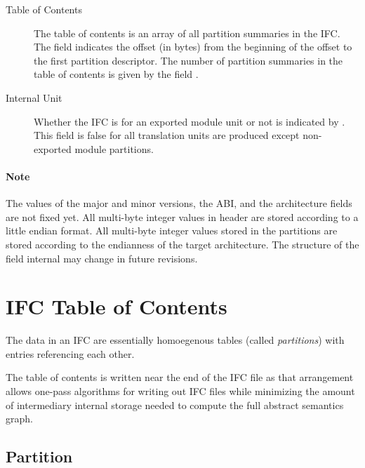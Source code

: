 \begin{description}
\item[Table of Contents]
	The table of contents is an array of all partition summaries in the IFC.  The field  indicates the offset (in bytes)
	from the beginning of the offset to the first partition descriptor.  The number of partition summaries in the table of contents
	is given by the field .

\item[Internal Unit]
	Whether the IFC is for an exported module unit or not is indicated by .  This field is false for all
	translation units are produced except non-exported module partitions.

\end{description}

\paragraph{Note}
The values of the major and minor versions, the ABI, and the architecture fields
are not fixed yet.   All multi-byte integer values in header are stored according to a little endian format.  All multi-byte integer values
stored in the partitions are stored according to the endianness of the target architecture.
The structure of the field {internal} may change in future revisions.



\section{IFC Table of Contents}
\label{sec:ifc-toc}

The data in an IFC are essentially homoegenous tables (called
\emph{partitions}) with entries referencing each other.  

The table of 
contents is written near the end of the IFC file as that arrangement
allows one-pass algorithms for writing out IFC files while minimizing
the amount of intermediary internal storage needed to compute the full
abstract semantics graph.

\subsection{Partition}
\label{sec:ifc-partition}

